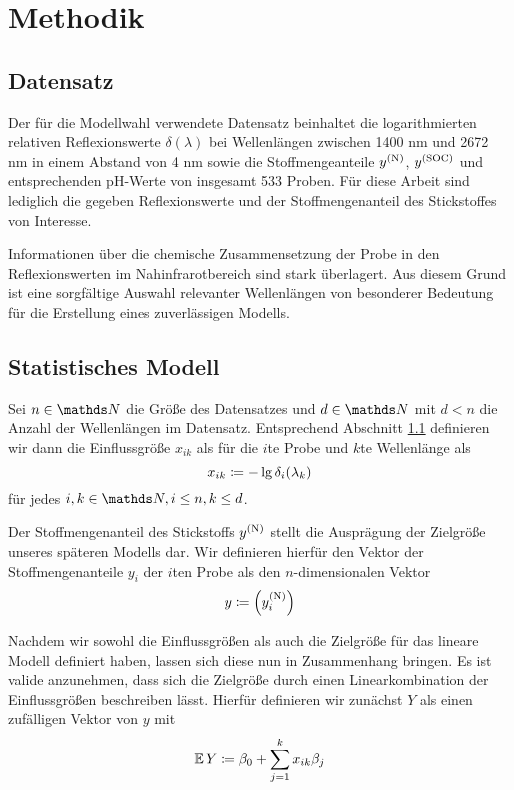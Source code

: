 \section{Methodik}
\label{sec:Methodik}

	\subsection{Datensatz}
	\label{ssec:Datensatz}

	    Der für die Modellwahl verwendete Datensatz beinhaltet die logarithmierten relativen Reflexionswerte $\delta(\lambda)$ bei Wellenlängen zwischen 1400 nm und 2672 nm in einem Abstand von 4 nm sowie die Stoffmengeanteile $y^{\mathrm{(N)}}$, $y^{\mathrm{(SOC)}}$ und entsprechenden pH-Werte von insgesamt 533 Proben.
	    Für diese Arbeit sind lediglich die gegeben Reflexionswerte und der Stoffmengenanteil des Stickstoffes von Interesse.

	    Informationen über die chemische Zusammensetzung der Probe in den Reflexionswerten im Nahinfrarotbereich sind stark überlagert. \cite{Agelet2010}
	    Aus diesem Grund ist eine sorgfältige Auswahl relevanter Wellenlängen von besonderer Bedeutung für die Erstellung eines zuverlässigen Modells.



	\subsection{Statistisches Modell}
	\label{ssec:Statistisches Modell}

	    Sei $n\in\SN$ die Größe des Datensatzes und $d\in\SN$ mit $d< n$ die Anzahl der Wellenlängen im Datensatz.
	    Entsprechend Abschnitt \ref{ssec:Datensatz} definieren wir dann die Einflussgröße $x_{ik}$ als für die $i$te Probe und $k$te Wellenlänge als
	    \[
			x_{ik} \coloneqq -\lg \delta_i(\lambda_k)
		\]
		für jedes $i,k\in\SN,i\leq n,k\leq d$.

	    Der Stoffmengenanteil des Stickstoffs  $y^{\mathrm{(N)}}$ stellt die Ausprägung der Zielgröße unseres späteren Modells dar.
	    Wir definieren hierfür den Vektor der Stoffmengenanteile $y_i$ der $i$ten Probe als den $n$-dimensionalen Vektor
		\[
			 y \coloneqq \left( y^{\mathrm{(N)}}_i \right)
		\]

        Nachdem wir sowohl die Einflussgrößen als auch die Zielgröße für das lineare Modell definiert haben, lassen sich diese nun in Zusammenhang bringen.
        Es ist valide anzunehmen, dass sich die Zielgröße durch einen Linearkombination der Einflussgrößen beschreiben lässt.
        Hierfür definieren wir zunächst $Y$ als einen zufälligen Vektor von $y$ mit
        \[
			 \operatorname{\mathbb{E}} Y \coloneqq \beta_0 + \sum_{j=1}^k{x_{ik}\beta_j}
		\]

